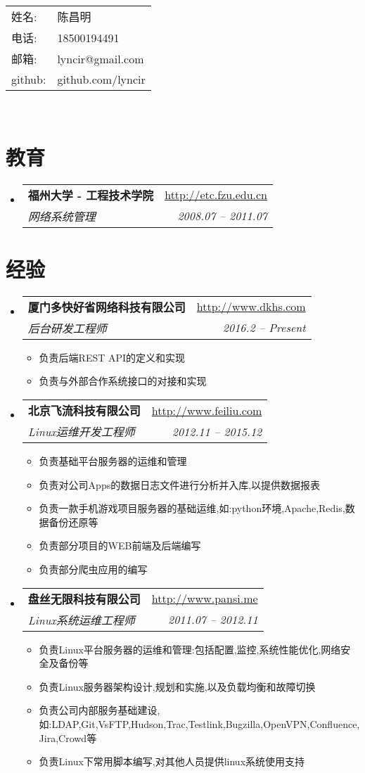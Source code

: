 \documentclass[11pt,letterpaper]{article}
\makeatletter
\newcommand{\resitem}[1]{\item #1 \vspace{-2pt}}
\newcommand{\ressubheading}[4]{
\begin{tabular*}{6.5in}{l@{\extracolsep{\fill}}r}
	\textbf{#1} & \url{#2} \\
	\textit{#3} & \textit{#4} \\
\end{tabular*}\vspace{-6pt}}
\makeatother
\begin{document}
\begin{CJK}{UTF8}{gbsn}

\begin{tabular}{p{1.2cm}l}
	姓名: & 陈昌明 \\
	电话: & 18500194491 \\
	邮箱: & lyncir@gmail.com \\
	github: & github.com/lyncir \\
\end{tabular}
\\
\vspace{0.1in}

\section{教育}  
	\begin{itemize}
	 	\item    
			\ressubheading{福州大学 - 工程技术学院}{http://etc.fzu.edu.cn}{网络系统管理}{2008.07 -- 2011.07}
	\end{itemize}

\section {经验}   
	\begin{itemize}
		\item 
			\ressubheading{厦门多快好省网络科技有限公司}{http://www.dkhs.com}{后台研发工程师}{2016.2 -- Present}
				{ \footnotesize
				\begin{itemize}
						\resitem{负责后端REST API的定义和实现}
						\resitem{负责与外部合作系统接口的对接和实现}
				\end{itemize}
			 	}     
		\item 
			\ressubheading{北京飞流科技有限公司}{http://www.feiliu.com}{Linux运维开发工程师}{2012.11 -- 2015.12}
				{ \footnotesize
				\begin{itemize}
						\resitem{负责基础平台服务器的运维和管理}
						\resitem{负责对公司Apps的数据日志文件进行分析并入库,以提供数据报表}
						\resitem{负责一款手机游戏项目服务器的基础运维,如:python环境,Apache,Redis,数据备份还原等}
						\resitem{负责部分项目的WEB前端及后端编写}
						\resitem{负责部分爬虫应用的编写}
				\end{itemize}
			 	}     
		\item 
			\ressubheading{盘丝无限科技有限公司}{http://www.pansi.me}{Linux系统运维工程师}{2011.07 -- 2012.11}
				{ \footnotesize
				\begin{itemize}
						\resitem{负责Linux平台服务器的运维和管理:包括配置,监控,系统性能优化,网络安全及备份等}
						\resitem{负责Linux服务器架构设计,规划和实施,以及负载均衡和故障切换}
						\resitem{负责公司内部服务基础建设,如:LDAP,Git,VsFTP,Hudson,Trac,Testlink,Bugzilla,OpenVPN,Confluence,Jira,Crowd等}
						\resitem{负责Linux下常用脚本编写,对其他人员提供linux系统使用支持}
				\end{itemize}
			 	}     
	\end{itemize}


\end{CJK}
\end{document}
